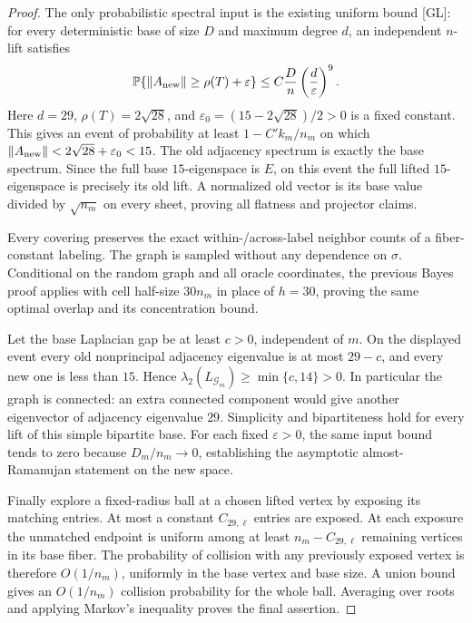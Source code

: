 \documentclass[11pt]{article}
\newcommand{\PP}{\mathbb P}
\begin{document}
\begin{proof}
The only probabilistic spectral input is the existing uniform bound [GL]:
for every deterministic base of size $D$ and maximum degree $d$,
an independent $n$-lift satisfies
\[
 \PP\{\|A_{\rm new}\|\geq\rho(T)+\varepsilon\}
 \leq C\frac Dn\left(\frac d\varepsilon\right)^9.
\]
Here $d=29$, $\rho(T)=2\sqrt{28}$, and
$\varepsilon_0=(15-2\sqrt{28})/2>0$ is a fixed constant. This gives an event
of probability at least $1-C'k_m/n_m$ on which
$\|A_{\rm new}\|<2\sqrt{28}+\varepsilon_0<15$.
The old adjacency spectrum is exactly the base spectrum. Since the full
base $15$-eigenspace is $E$, on this event the full lifted $15$-eigenspace
is precisely its old lift. A normalized old vector is its base value divided
by $\sqrt{n_m}$ on every sheet, proving all flatness and projector claims.

Every covering preserves the exact within-/across-label neighbor counts
of a fiber-constant labeling. The graph is sampled without any dependence
on $\sigma$. Conditional on the random graph and all oracle coordinates,
the previous Bayes proof applies with cell half-size $30n_m$ in place of
$h=30$, proving the same optimal overlap and its concentration bound.

Let the base Laplacian gap be at least $c>0$, independent of $m$. On the
displayed event every old nonprincipal adjacency eigenvalue is at most
$29-c$, and every new one is less than $15$. Hence
$\lambda_2(L_{\mathcal G_m})\geq\min\{c,14\}>0$. In particular the graph
is connected: an extra connected component would give another eigenvector
of adjacency eigenvalue $29$. Simplicity and bipartiteness hold for every
lift of this simple bipartite base. For each fixed $\varepsilon>0$, the
same input bound tends to zero because $D_m/n_m\to0$, establishing the
asymptotic almost-Ramanujan statement on the new space.

Finally explore a fixed-radius ball at a chosen lifted vertex by exposing
its matching entries. At most a constant $C_{29,\ell}$ entries are exposed.
At each exposure the unmatched endpoint is uniform among at least
$n_m-C_{29,\ell}$ remaining vertices in its base fiber. The probability of
collision with any previously exposed vertex is therefore $O(1/n_m)$,
uniformly in the base vertex and base size. A union bound gives an
$O(1/n_m)$ collision probability for the whole ball. Averaging over roots
and applying Markov's inequality proves the final assertion.
\end{proof}
\end{document}
